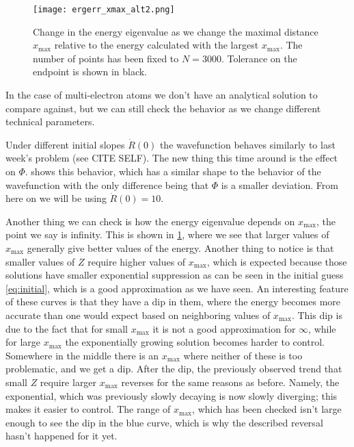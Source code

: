 \documentclass[10pt,a4paper,twocolumn]{article}
\begin{document}
\begin{figure}[!hb]
    \centering
    \texttt{[image: ergerr\_xmax\_alt2.png]}
    \caption{Change in the energy eigenvalue as we change the maximal distance $x_{\mathrm{max}}$ relative to the energy calculated with the largest $x_{\mathrm{max}}$. The number of points has been fixed to $N = 3000$. Tolerance on the endpoint is shown in black.}
    \label{fig:xmax_ergerr}
\end{figure}

In the case of multi-electron atoms we don't have an analytical solution to compare against, but we can still check the behavior as we change different technical parameters.


Under different initial slopes $\dot{R}(0)$ the wavefunction behaves similarly to last week's problem (see CITE SELF). The new thing this time around is the effect on $\Phi$.  shows this behavior, which has a similar shape to the behavior of the wavefunction with the only difference being that $\Phi$ is a smaller deviation. From here on we will be using $\dot{R}(0) = 10$.

Another thing we can check is how the energy eigenvalue depends on $x_{\mathrm{max}}$, the point we say is infinity. This is shown in \cref{fig:xmax_ergerr}, where we see that larger values of $x_{\mathrm{max}}$ generally give better values of the energy. Another thing to notice is that smaller values of $Z$ require higher values of $x_{\mathrm{max}}$, which is expected because those solutions have smaller exponential suppression as can be seen in the initial guess \cref{eq:initial}, which is a good approximation as we have seen. An interesting feature of these curves is that they have a dip in them, where the energy becomes more accurate than one would expect based on neighboring values of $x_{\mathrm{max}}$. This dip is due to the fact that for small $x_{\mathrm{max}}$ it is not a good approximation for $\infty$, while for large $x_{\mathrm{max}}$ the exponentially growing solution becomes harder to control. Somewhere in the middle there is an $x_{\mathrm{max}}$ where neither of these is too problematic, and we get a dip. After the dip, the previously observed trend that small $Z$ require larger $x_{\mathrm{max}}$ reverses for the same reasons as before. Namely, the exponential, which was previously slowly decaying is now slowly diverging; this makes it easier to control. The range of $x_{\mathrm{max}}$, which has been checked isn't large enough to see the dip in the blue curve, which is why the described reversal hasn't happened for it yet.
\end{document}
